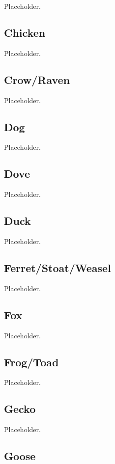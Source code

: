 Placeholder.

\subsection{Chicken}

Placeholder.

\subsection{Crow/Raven}

Placeholder.

\subsection{Dog}

Placeholder.

\subsection{Dove}

Placeholder.

\subsection{Duck}

Placeholder.

\subsection{Ferret/Stoat/Weasel}

Placeholder.

\subsection{Fox}

Placeholder.

\subsection{Frog/Toad}

Placeholder.

\subsection{Gecko}

Placeholder.

\subsection{Goose}

